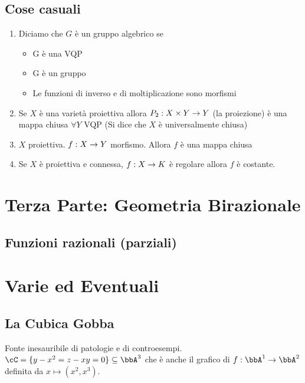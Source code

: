 \documentclass[a4paper,NoNotes,GeneralMath]{stdmdoc}
\begin{document}
	\subsection*{Cose casuali}
	\begin{enumerate}
	\item Diciamo che $G$ è un gruppo algebrico se
		\begin{itemize}
			\item G è una VQP
			\item G è un gruppo
			\item Le funzioni di inverso e di moltiplicazione sono morfismi
		\end{itemize}
	\item Se $X$ è una varietà proiettiva allora $P_2: X \times Y \rightarrow Y$ (la proiezione) è una mappa chiusa $\forall Y$ VQP (Si dice che $X$ è universalmente chiusa)
	\item $X$ proiettiva. $f: X \rightarrow Y$ morfismo. Allora $f$ è una mappa chiusa
	\item Se $X$ è proiettiva e connessa, $f: X \rightarrow K$ è regolare allora $f$ è costante.
	\end{enumerate}	
	
	\section*{Terza Parte: Geometria Birazionale}
	\subsection*{Funzioni razionali (parziali)}
	
	
	\section*{Varie ed Eventuali}
	\subsection*{La Cubica Gobba}
	Fonte inesauribile di patologie e di controesempi. $\cC = \{ y-x^2 = z-xy = 0 \} \subseteq \bbA^3$ che è anche il grafico di $f: \bbA^1 \rar \bbA^2$ definita da $x \mapsto (x^2, x^3)$.
	
\end{document}
